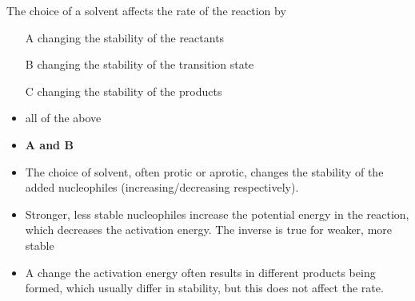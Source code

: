 \documentclass[12pt,a4paper]{article}
\begin{document}
\begin{enumerate}
\begin{itemize}
        \end{itemize}
    {\color{G-Moon}\item The choice of a solvent affects the rate of the reaction by
    \begin{itemize}
        \item[A] changing the stability of the reactants
        \item[B] changing the stability of the transition state
        \item[C] changing the stability of the products
        \item all of the above
        \item {\color{o-Sun}\textbf{A and B}}
    \end{itemize}}
        \begin{itemize}
            \item The choice of solvent, often protic or aprotic, changes the stability of the added nucleophiles (increasing/decreasing respectively). 
            \item Stronger, less stable nucleophiles increase the potential energy in the reaction, which decreases the activation energy. The inverse is true for weaker, more stable 
            \item A change the activation energy often results in different products being formed, which usually differ in stability, but this does not affect the rate.
        \end{itemize}
        
\end{enumerate}
\end{document}
